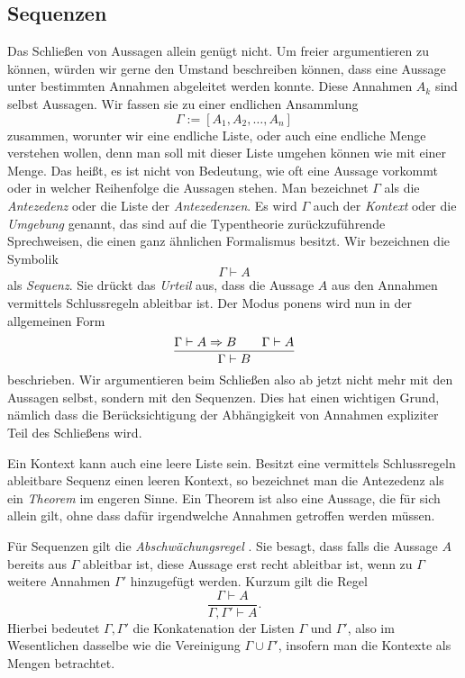 \subsection{Sequenzen}

Das Schließen von Aussagen allein genügt nicht. Um freier argumentieren
zu können, würden wir gerne den Umstand beschreiben können, dass eine
Aussage unter bestimmten Annahmen abgeleitet werden konnte. Diese
Annahmen $A_k$ sind selbst Aussagen. Wir fassen sie zu einer endlichen
Ansammlung
\[\Gamma := [A_1,A_2,\ldots,A_n]\]
zusammen, worunter wir eine endliche Liste, oder auch eine endliche
Menge verstehen wollen, denn man soll mit dieser Liste umgehen können
wie mit einer Menge. Das heißt, es ist nicht von Bedeutung, wie
oft eine Aussage vorkommt oder in welcher Reihenfolge die Aussagen
stehen. Man bezeichnet $\Gamma$ als die \emph{Antezedenz}%
 oder die Liste der \emph{Antezedenzen}. Es wird
$\Gamma$ auch der \emph{Kontext}
oder die \emph{Umgebung} genannt, das sind auf die
Typentheorie zurückzuführende Sprechweisen, die einen ganz ähnlichen
Formalismus besitzt. Wir bezeichnen die Symbolik \[\Gamma\vdash A\]
als \emph{Sequenz}. Sie drückt das \emph{Urteil}%
 aus, dass die Aussage $A$ aus den Annahmen
vermittels Schlussregeln ableitbar ist. Der Modus ponens%
 wird nun in der allgemeinen Form
\[\dfrac{\Gamma\vdash A\Rightarrow B\qquad\Gamma\vdash A}{\Gamma\vdash B}\]
beschrieben. Wir argumentieren beim Schließen also ab jetzt nicht mehr
mit den Aussagen selbst, sondern mit den Sequenzen. Dies hat einen wichtigen
Grund, nämlich dass die Berücksichtigung der Abhängigkeit von Annahmen
expliziter Teil des Schließens wird.

Ein Kontext kann auch eine leere Liste sein. Besitzt eine vermittels
Schlussregeln ableitbare Sequenz einen leeren Kontext, so bezeichnet
man die Antezedenz als ein \emph{Theorem} im engeren
Sinne. Ein Theorem ist also eine Aussage, die für sich allein gilt,
ohne dass dafür irgendwelche Annahmen getroffen werden müssen.

Für Sequenzen gilt die \emph{Abschwächungsregel}%
. Sie besagt, dass
falls die Aussage $A$ bereits aus $\Gamma$ ableitbar ist, diese
Aussage erst recht ableitbar ist, wenn zu $\Gamma$ weitere Annahmen
$\Gamma'$ hinzugefügt werden. Kurzum gilt die Regel
\[\dfrac{\Gamma\vdash A}{\Gamma,\Gamma'\vdash A}.\]
Hierbei bedeutet $\Gamma,\Gamma'$ die Konkatenation der Listen
$\Gamma$ und $\Gamma'$, also im Wesentlichen dasselbe wie die
Vereinigung $\Gamma\cup\Gamma'$, insofern man die Kontexte als
Mengen betrachtet.

